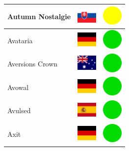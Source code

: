 \documentclass[12pt, a4paper, twoside]{report}
\begin{document}
\begin{center}
\begin{longtable}{|p{5cm}|p{2cm}|p{2cm}|}
 Autumn Nostalgie                                           & \includegraphics[width=1cm]{../img/flags/sk} &   \includegraphics[width=1cm]{../likes/m} \\ \hline
 Avataria                                                   & \includegraphics[width=1cm]{../img/flags/de} &   \includegraphics[width=1cm]{../likes/y} \\ \hline
 Aversions Crown                                            & \includegraphics[width=1cm]{../img/flags/au} &   \includegraphics[width=1cm]{../likes/y} \\ \hline
 Avowal                                                     & \includegraphics[width=1cm]{../img/flags/de} &   \includegraphics[width=1cm]{../likes/y} \\ \hline
 Avulsed                                                    & \includegraphics[width=1cm]{../img/flags/es} &   \includegraphics[width=1cm]{../likes/y} \\ \hline
 Axit                                                       & \includegraphics[width=1cm]{../img/flags/de} &   \includegraphics[width=1cm]{../likes/y} \\ \hline

\end{longtable}
\end{center}
\end{document}
